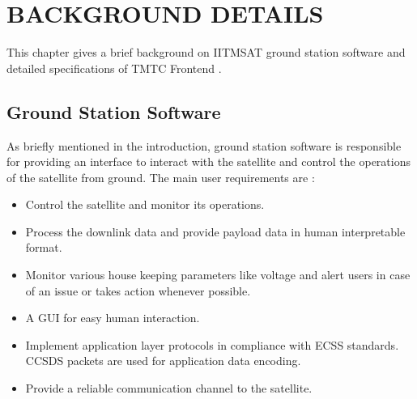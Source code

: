 \documentclass[BTech]{iitmdiss}
\begin{document}
 \chapter{BACKGROUND DETAILS}
 \label{chap:background}
This chapter gives a brief background on IITMSAT ground station software and detailed specifications of TMTC Frontend .
\section{Ground Station Software}
As briefly mentioned in the introduction, ground station software is responsible for providing an interface to interact with the satellite and control the operations of the satellite from ground. The main user requirements are :
\begin{itemize}
\item Control the satellite and monitor its operations.
\item Process the downlink data and provide payload data in human interpretable format.
\item Monitor various house keeping parameters like voltage and alert users in case of an issue or takes action whenever possible.
\item A GUI for easy human interaction.
\item Implement application layer protocols in compliance with ECSS standards. CCSDS packets are used for application data encoding. 
\item Provide a reliable communication channel to the satellite. 
\end{itemize}
\end{document}
